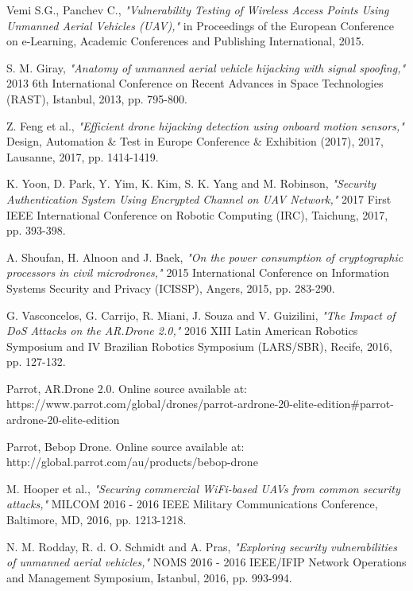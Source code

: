 \documentclass[journal]{IEEEtran}
\begin{document}
\begin{thebibliography}{1}
Vemi S.G., Panchev C., \textit{"Vulnerability Testing of Wireless Access Points Using Unmanned Aerial Vehicles (UAV),"} in Proceedings of the European Conference on e-Learning, Academic Conferences and Publishing International, 2015.

S. M. Giray, \textit{"Anatomy of unmanned aerial vehicle hijacking with signal spoofing,"} 2013 6th International Conference on Recent Advances in Space Technologies (RAST), Istanbul, 2013, pp. 795-800.

Z. Feng et al., \textit{"Efficient drone hijacking detection using onboard motion sensors,"} Design, Automation \& Test in Europe Conference \& Exhibition (2017), 2017, Lausanne, 2017, pp. 1414-1419.

K. Yoon, D. Park, Y. Yim, K. Kim, S. K. Yang and M. Robinson, \textit{"Security Authentication System Using Encrypted Channel on UAV Network,"} 2017 First IEEE International Conference on Robotic Computing (IRC), Taichung, 2017, pp. 393-398.

A. Shoufan, H. Alnoon and J. Baek, \textit{"On the power consumption of cryptographic processors in civil microdrones,"} 2015 International Conference on Information Systems Security and Privacy (ICISSP), Angers, 2015, pp. 283-290.

G. Vasconcelos, G. Carrijo, R. Miani, J. Souza and V. Guizilini, \textit{"The Impact of DoS Attacks on the AR.Drone 2.0,"} 2016 XIII Latin American Robotics Symposium and IV Brazilian Robotics Symposium (LARS/SBR), Recife, 2016, pp. 127-132.

Parrot, AR.Drone 2.0. Online source available at: https://www.parrot.com/global/drones/parrot-ardrone-20-elite-edition\#parrot-ardrone-20-elite-edition

Parrot, Bebop Drone. Online source available at: http://global.parrot.com/au/products/bebop-drone

M. Hooper et al., \textit{"Securing commercial WiFi-based UAVs from common security attacks,"} MILCOM 2016 - 2016 IEEE Military Communications Conference, Baltimore, MD, 2016, pp. 1213-1218.

N. M. Rodday, R. d. O. Schmidt and A. Pras,\textit{ "Exploring security vulnerabilities of unmanned aerial vehicles,"} NOMS 2016 - 2016 IEEE/IFIP Network Operations and Management Symposium, Istanbul, 2016, pp. 993-994.


\end{thebibliography}
\end{document}

